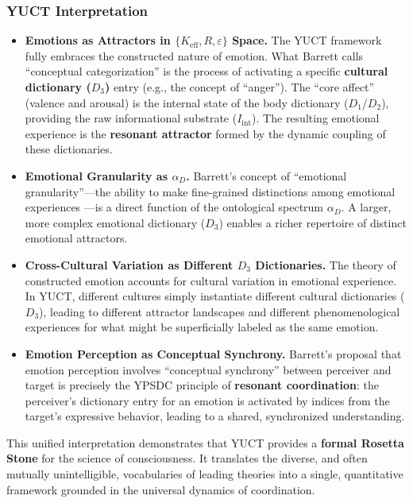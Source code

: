 \documentclass[12pt,a4paper]{article}
\begin{document}
	\subsubsection*{YUCT Interpretation}
	\begin{itemize}
		\item \textbf{Emotions as Attractors in \(\{K_{\mathrm{eff}}, R, \varepsilon\}\) Space.} The YUCT framework fully embraces the constructed nature of emotion. What Barrett calls ``conceptual categorization'' is the process of activating a specific \textbf{cultural dictionary (\(D_3\))} entry (e.g., the concept of ``anger''). The ``core affect'' (valence and arousal) is the internal state of the body dictionary (\(D_1\)/\(D_2\)), providing the raw informational substrate (\(I_{\mathrm{int}}\)). The resulting emotional experience is the \textbf{resonant attractor} formed by the dynamic coupling of these dictionaries.
		\item \textbf{Emotional Granularity as \(\alpha_D\).} Barrett's concept of ``emotional granularity''---the ability to make fine-grained distinctions among emotional experiences \cite{Barrett2025}---is a direct function of the ontological spectrum \(\alpha_D\). A larger, more complex emotional dictionary (\(D_3\)) enables a richer repertoire of distinct emotional attractors.
		\item \textbf{Cross-Cultural Variation as Different \(D_3\) Dictionaries.} The theory of constructed emotion accounts for cultural variation in emotional experience. In YUCT, different cultures simply instantiate different cultural dictionaries (\(D_3\)), leading to different attractor landscapes and different phenomenological experiences for what might be superficially labeled as the same emotion.
		\item \textbf{Emotion Perception as Conceptual Synchrony.} Barrett's proposal that emotion perception involves ``conceptual synchrony'' between perceiver and target \cite{Gendron2018} is precisely the YPSDC principle of \textbf{resonant coordination}: the perceiver's dictionary entry for an emotion is activated by indices from the target's expressive behavior, leading to a shared, synchronized understanding.
	\end{itemize}
	
	This unified interpretation demonstrates that YUCT provides a \textbf{formal Rosetta Stone} for the science of consciousness. It translates the diverse, and often mutually unintelligible, vocabularies of leading theories into a single, quantitative framework grounded in the universal dynamics of coordination.
	
\end{document}
